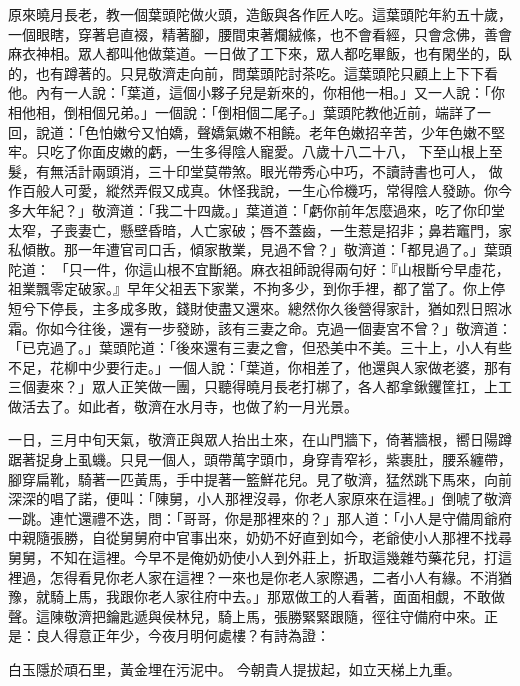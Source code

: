\begin{showcontents}{}
原來曉月長老，教一個葉頭陀做火頭，造飯與各作匠人吃。這葉頭陀年約五十歲，一個眼瞎，穿著皂直裰，精著腳，腰間束著爛絨絛，也不會看經，只會念佛，善會麻衣神相。眾人都叫他做葉道。一日做了工下來，眾人都吃畢飯，也有閑坐的，臥的，也有蹲著的。只見敬濟走向前，問葉頭陀討茶吃。這葉頭陀只顧上上下下看他。內有一人說：「葉道，這個小夥子兒是新來的，你相他一相。」又一人說：「你相他相，倒相個兄弟。」一個說：「倒相個二尾子。」葉頭陀教他近前，端詳了一回，說道：「色怕嫩兮又怕嬌，聲嬌氣嫩不相饒。老年色嫩招辛苦，少年色嫩不堅牢。只吃了你面皮嫩的虧，一生多得陰人寵愛。八歲十八二十八，
下至山根上至髮，有無活計兩頭消，三十印堂莫帶煞。眼光帶秀心中巧，不讀詩書也可人，
做作百般人可愛，縱然弄假又成真。休怪我說，一生心伶機巧，常得陰人發跡。你今多大年紀？」敬濟道：「我二十四歲。」葉道道：「虧你前年怎麼過來，吃了你印堂太窄，子喪妻亡，懸壁昏暗，人亡家破；唇不蓋齒，一生惹是招非；鼻若竈門，家私傾散。那一年遭官司口舌，傾家散業，見過不曾？」敬濟道：「都見過了。」葉頭陀道： 「只一件，你這山根不宜斷絕。麻衣祖師說得兩句好：『山根斷兮早虛花，祖業飄零定破家。』早年父祖丟下家業，不拘多少，到你手裡，都了當了。你上停短兮下停長，主多成多敗，錢財使盡又還來。總然你久後營得家計，猶如烈日照冰霜。你如今往後，還有一步發跡，該有三妻之命。克過一個妻宮不曾？」敬濟道：「已克過了。」葉頭陀道：「後來還有三妻之會，但恐美中不美。三十上，小人有些不足，花柳中少要行走。」一個人說：「葉道，你相差了，他還與人家做老婆，那有三個妻來？」眾人正笑做一團，只聽得曉月長老打梆了，各人都拿鍬钁筐扛，上工做活去了。如此者，敬濟在水月寺，也做了約一月光景。

一日，三月中旬天氣，敬濟正與眾人抬出土來，在山門牆下，倚著牆根，嚮日陽蹲踞著捉身上虱蟣。只見一個人，頭帶萬字頭巾，身穿青窄衫，紫裹肚，腰系纏帶，腳穿扁靴，騎著一匹黃馬，手中提著一籃鮮花兒。見了敬濟，猛然跳下馬來，向前深深的唱了諾，便叫：「陳舅，小人那裡沒尋，你老人家原來在這裡。」倒唬了敬濟一跳。連忙還禮不迭，問：「哥哥，你是那裡來的？」那人道：「小人是守備周爺府中親隨張勝，自從舅舅府中官事出來，奶奶不好直到如今，老爺使小人那裡不找尋舅舅，不知在這裡。今早不是俺奶奶使小人到外莊上，折取這幾雜芍藥花兒，打這裡過，怎得看見你老人家在這裡？一來也是你老人家際遇，二者小人有緣。不消猶豫，就騎上馬，我跟你老人家往府中去。」那眾做工的人看著，面面相覷，不敢做聲。這陳敬濟把鑰匙遞與侯林兒，騎上馬，張勝緊緊跟隨，徑往守備府中來。正是：良人得意正年少，今夜月明何處樓？有詩為證：

白玉隱於頑石里，黃金埋在污泥中。
今朝貴人提拔起，如立天梯上九重。


\end{showcontents}

